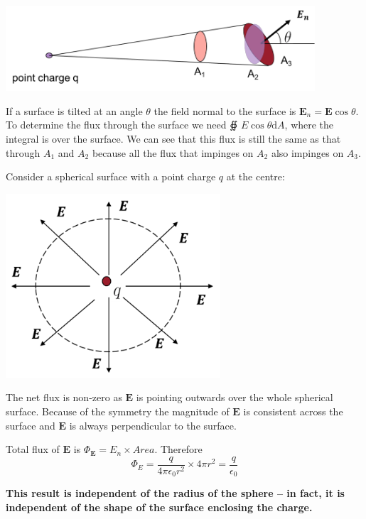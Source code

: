 \documentclass[
]{book}
\numberwithin{equation}{section}
\begin{document}
\includegraphics[width=115mm,height=\textheight]{Figures/elecFlux2.png} \protect\hypertarget{fig:elecFlux2}{}{}

If a surface is tilted at an angle \(\theta\) the field normal to the
surface is \(\mathbf{E}_n = \mathbf{E} \cos\theta\). To determine the flux through the
surface we need ∯ \(E \cos\theta \mathrm{d} A\), where the integral is over
the surface. We can see that this flux is still the same as that through
\(A_1\) and \(A_2\) because all the flux that impinges on \(A_2\) also
impinges on \(A_3\).

Consider a spherical surface with a point charge \(q\) at the centre:

\includegraphics[width=80mm,height=\textheight]{Figures/elecFlux3.png} \protect\hypertarget{fig:elecFlux3}{}{}

The net flux is non-zero as \(\mathbf{E}\) is pointing outwards over the whole
spherical surface. Because of the symmetry the magnitude of \(\mathbf{E}\) is
consistent across the surface and \(\mathbf{E}\) is always perpendicular to the
surface.

Total flux of \(\mathbf{E}\) is \(\Phi_{\mathbf{E}} = E_n \times Area\). Therefore
\begin{equation}
\label{eq:fluxE}
\Phi_E = \frac{q}{4\pi\epsilon_0 r^2} \times 4\pi r^2 = \frac{q}{\epsilon_0} 
\end{equation}

\textbf{This result is independent of the radius of the sphere -- in fact, it
is independent of the shape of the surface enclosing the charge.}
\end{document}
